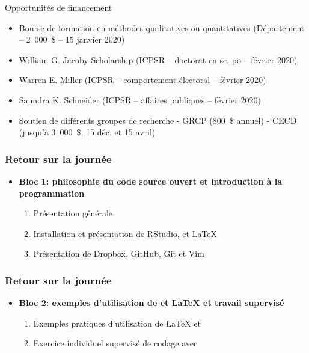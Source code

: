 \documentclass{beamer}
\begin{document}
\begin{frame}{Opportunités de financement}

\begin{itemize}
    \item Bourse de formation en méthodes qualitatives ou quantitatives (Département -- 2~000~\$ -- 15 janvier 2020)
    \item William G. Jacoby Scholarship (ICPSR -- doctorat en sc. po -- février 2020)
    \item Warren E. Miller (ICPSR -- comportement électoral -- février 2020)
    \item Saundra K. Schneider (ICPSR -- affaires publiques -- février 2020)
    \item Soutien de différents groupes de recherche \newline
    - GRCP (800~\$ annuel) \newline
    - CECD (jusqu'à 3~000~\$, 15 déc. et 15 avril)
\end{itemize}

\end{frame}

    \begin{frame}
      \frametitle{Retour sur la journée}
      \begin{itemize}
        \item \textbf{Bloc 1: philosophie du code source ouvert et introduction à la programmation}
          \begin{enumerate}
            \item Présentation générale
            \item Installation et présentation de RStudio, \R et \LaTeX
            \item Présentation de Dropbox, GitHub, Git et Vim
          \end{enumerate}
        \end{itemize}
    \end{frame}
    
    \begin{frame}
      \frametitle{Retour sur la journée}
        \begin{itemize}
        \item \textbf{Bloc 2: exemples d'utilisation de \R et \LaTeX{} et travail supervisé}
          \begin{enumerate}
            \item Exemples pratiques d'utilisation de \LaTeX{} et \R
            \item Exercice individuel supervisé de codage avec \R
          \end{enumerate}
      \end{itemize}
    \end{frame}
    
\end{document}
